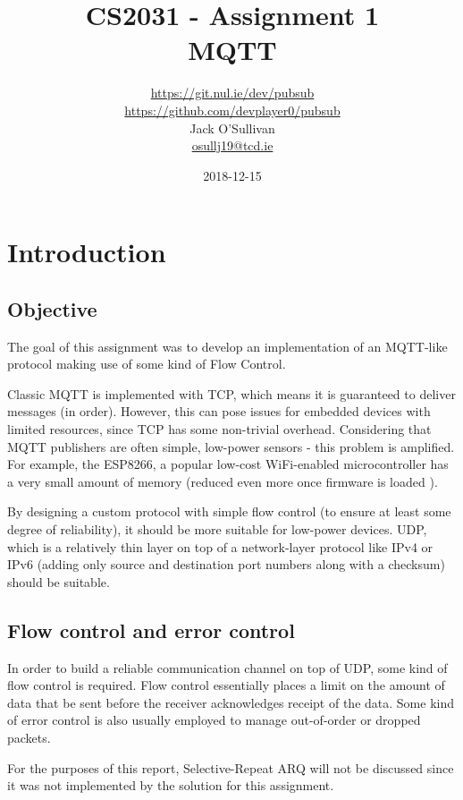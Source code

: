 \documentclass[a4paper]{article}
\title{CS2031 - Assignment 1\\MQTT}
\date{2018-12-15}
\author{\url{https://git.nul.ie/dev/pubsub}\\\url{https://github.com/devplayer0/pubsub}\\Jack O'Sullivan\\\href{mailto:osullj19@tcd.ie}{osullj19@tcd.ie}}
\numberwithin{figure}{section}
\numberwithin{table}{section}
\begin{document}
\maketitle
\tableofcontents
{}

\newpage
{}
\section{Introduction}
\subsection{Objective}
The goal of this assignment was to develop an implementation of an MQTT-like protocol making use of some kind of Flow Control.

Classic MQTT is implemented with TCP, which means it is guaranteed to deliver messages (in order). However, this can pose issues for embedded devices with limited resources, since TCP has some non-trivial overhead. Considering that MQTT publishers are often simple, low-power sensors - this problem is amplified.
For example, the ESP8266, a popular low-cost WiFi-enabled microcontroller \cite{esp8266} has a very small amount of memory (reduced even more once firmware is loaded \cite{esp8266-lowmem}).

\medskip
By designing a custom protocol with simple flow control (to ensure at least some degree of reliability), it should be more suitable for low-power devices. UDP, which is a relatively thin layer on top of a network-layer protocol like IPv4 or IPv6 (adding only source and destination port numbers along with a checksum) should be suitable.

\subsection{Flow control and error control}
In order to build a reliable communication channel on top of UDP, some kind of flow control is required. Flow control essentially places a limit on the amount of data that be sent before the receiver acknowledges receipt of the data. Some kind of error control is also usually employed to manage out-of-order or dropped packets.

For the purposes of this report, Selective-Repeat ARQ will not be discussed since it was not implemented by the solution for this assignment.
\end{document}
